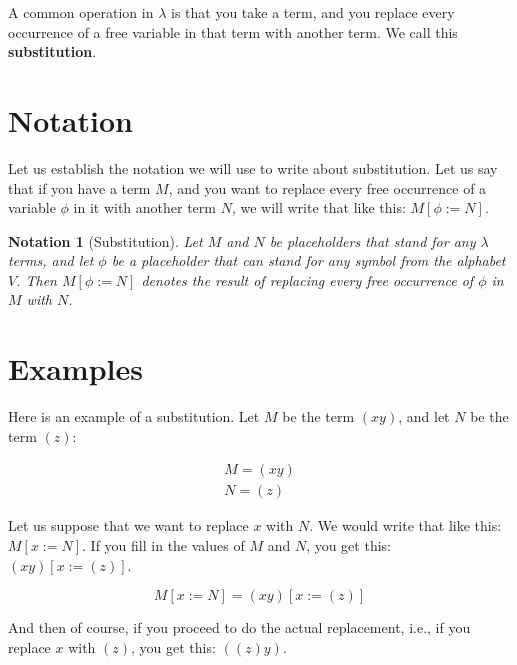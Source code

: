 \documentclass{book}
\numberwithin{equation}{chapter}
\newcommand{\vocab}{\textbf}
\newtheorem{notation}{Notation}
\begin{document}
A common operation in $\lambda$ is that you take a term, and you replace every occurrence of a free variable in that term with another term. We call this \vocab{substitution}.


\section{Notation}

Let us establish the notation we will use to write about substitution. Let us say that if you have a term $M$, and you want to replace every free occurrence of a variable $\phi$ in it with another term $N$, we will write that like this: $M[\phi := N]$. 

\begin{notation}[Substitution]
Let $M$ and $N$ be placeholders that stand for any $\lambda$ terms, and let $\phi$ be a placeholder that can stand for any symbol from the alphabet $V$. Then $M[\phi := N]$ denotes the result of replacing every free occurrence of $\phi$ in $M$ with $N$.
\end{notation}


\section{Examples}

Here is an example of a substitution. Let $M$ be the term $(x y)$, and let $N$ be the term $(z)$:

\begin{align}
M = (x y) \\
N = (z)
\end{align}

\noindent
Let us suppose that we want to replace $x$ with $N$. We would write that like this: $M[x := N]$. If you fill in the values of $M$ and $N$, you get this: $(x y)[x := (z)]$.

\begin{equation}
M[x := N] = (x y)[x := (z)]
\end{equation}

\noindent
And then of course, if you proceed to do the actual replacement, i.e., if you replace $x$ with $(z)$, you get this: $((z) y)$.
\end{document}
